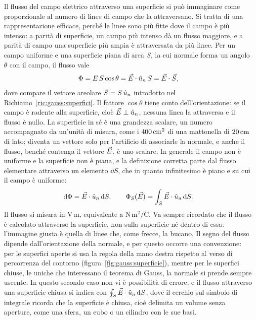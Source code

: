 \documentclass[11pt,a4paper]{article}
\begin{document}
Il flusso del campo elettrico attraverso una superficie si può immaginare come proporzionale al numero di linee di campo che la attraversano. Si tratta di una rappresentazione efficace, perché le linee sono più fitte dove il campo è più intenso: a parità di superficie, un campo più intenso dà un flusso maggiore, e a parità di campo una superficie più ampia è attraversata da più linee. Per un campo uniforme e una superficie piana di area $S$, la cui normale forma un angolo $\theta$ con il campo, il flusso vale
\[
\Phi=E\,S\cos\theta=\vec{E}\cdot\hat{u}_n\,S=\vec{E}\cdot\vec{S},
\]
dove compare il vettore areolare $\vec{S}=S\,\hat{u}_n$ introdotto nel Richiamo~\ref{ric:gauss:superfici}. Il fattore $\cos\theta$ tiene conto dell'orientazione: se il campo è radente alla superficie, cioè $\vec{E}\perp\hat{u}_n$, nessuna linea la attraversa e il flusso è nullo. La superficie in sé è una grandezza scalare, un numero accompagnato da un'unità di misura, come i $400\,\mathrm{cm^2}$ di una mattonella di $20\,\mathrm{cm}$ di lato; diventa un vettore solo per l'artificio di associarle la normale, e anche il flusso, benché contenga il vettore $\vec{E}$, è uno scalare. In generale il campo non è uniforme e la superficie non è piana, e la definizione corretta parte dal flusso elementare attraverso un elemento $\dd S$, che in quanto infinitesimo è piano e su cui il campo è uniforme:
\begin{equation}
\mathrm{d}\Phi=\vec{E}\cdot\hat{u}_n\,\mathrm{d} S ,\qquad \Phi_S(\vec{E})=\int_S\vec{E}\cdot\hat{u}_n\,\mathrm{d} S .
\label{eq:gauss:flusso}
\end{equation}
Il flusso si misura in $\mathrm{V\,m}$, equivalente a $\mathrm{N\,m^2/C}$. Va sempre ricordato che il flusso è calcolato attraverso la superficie, non sulla superficie né dentro di essa: l'immagine giusta è quella di linee che, come frecce, la bucano. Il segno del flusso dipende dall'orientazione della normale, e per questo occorre una convenzione: per le superfici aperte si usa la regola della mano destra rispetto al verso di percorrenza del contorno (figura~\ref{fig:gauss:superficie}), mentre per le superfici chiuse, le uniche che interessano il teorema di Gauss, la normale si prende sempre uscente. In questo secondo caso non vi è possibilità di errore, e il flusso attraverso una superficie chiusa si indica con $\oint_S\vec{E}\cdot\hat{u}_n\,\mathrm{d} S$, dove il cerchio sul simbolo di integrale ricorda che la superficie è chiusa, cioè delimita un volume senza aperture, come una sfera, un cubo o un cilindro con le sue basi.
\end{document}
